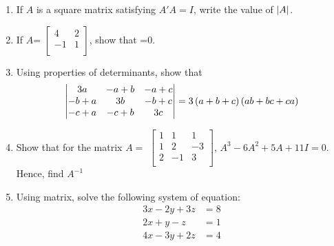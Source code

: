 \begin{enumerate}


\item If $A$ is a square matrix satisfying $A'A=I$, write the value of $\left\vert A\right\vert$.
\item If $A$= 
$\begin{bmatrix}
  4 & 2 \\
  -1 & 1 \\
\end{bmatrix}$, show that =0.

\item Using properties of determinants, show that
\[\begin{vmatrix}
3a      &     -a+b  &    -a+c\\
-b+a    &      3b   &    -b+c\\ 
-c+a    &     -c+b  &     3c 
\end{vmatrix}= 3\left(a+b+c\right)\left(ab+bc+ca\right)\]

\item Show that for the matrix $A=$ 
$\begin{bmatrix}
  1 & 1 &  1 \\
  1 & 2 & -3 \\
  2 & -1 & 3 \\
\end{bmatrix}$,
${A}^3 - 6{A}^2 + 5{A} +11 I = 0$.
Hence, find ${A}^{-1}$

\item  Using matrix, solve the following system of equation: 
\begin{align*}
  3x - 2y + 3z &= 8\\
  2x + y - z &= 1\\
  4x - 3y + 2z &= 4\\
\end{align*}
\end{enumerate}
